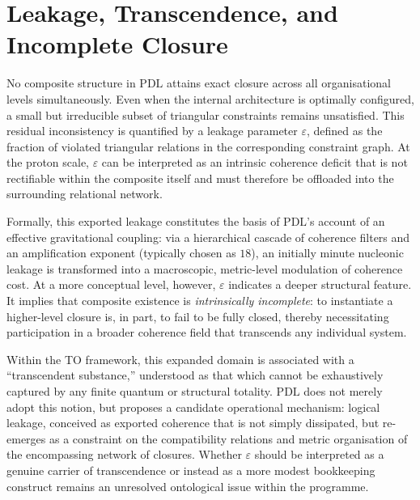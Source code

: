 \documentclass{article}
\theoremstyle{definition}
\newcommand{\PDL}{\ensuremath{\mathrm{PDL}}}
\begin{document}
\section{Leakage, Transcendence, and Incomplete Closure}
\label{sec:leakage}

No composite structure in \PDL{} attains exact closure across all organisational levels simultaneously.
Even when the internal architecture is optimally configured, a small but irreducible subset of triangular constraints remains unsatisfied.
This residual inconsistency is quantified by a leakage parameter \(\varepsilon\), defined as the fraction of violated triangular relations in the corresponding constraint graph.%
\cite{PDL_Topological_2026,PDL_Exponent18_2026_Refined}
At the proton scale, \(\varepsilon\) can be interpreted as an intrinsic coherence deficit that is not rectifiable within the composite itself and must therefore be offloaded into the surrounding relational network.

Formally, this exported leakage constitutes the basis of \PDL{}’s account of an effective gravitational coupling: via a hierarchical cascade of coherence filters and an amplification exponent (typically chosen as \(18\)), an initially minute nucleonic leakage is transformed into a macroscopic, metric-level modulation of coherence cost.%
\cite{PDL_Exponent18_2026_Refined,PDL_Effective_Fields_2026}
At a more conceptual level, however, \(\varepsilon\) indicates a deeper structural feature.
It implies that composite existence is \emph{intrinsically incomplete}: to instantiate a higher-level closure is, in part, to fail to be fully closed, thereby necessitating participation in a broader coherence field that transcends any individual system.%
\cite{PDL_Topological_2026,PDL_Position_2026}

Within the TO framework, this expanded domain is associated with a “transcendent substance,” understood as that which cannot be exhaustively captured by any finite quantum or structural totality.%
\cite{PDL_TO_Dialogue_2026}
\PDL{} does not merely adopt this notion, but proposes a candidate operational mechanism: logical leakage, conceived as exported coherence that is not simply dissipated, but re-emerges as a constraint on the compatibility relations and metric organisation of the encompassing network of closures.%
\cite{PDL_Topological_2026}
Whether \(\varepsilon\) should be interpreted as a genuine carrier of transcendence or instead as a more modest bookkeeping construct remains an unresolved ontological issue within the programme.%
\cite{PDL_Position_2026}
\end{document}
